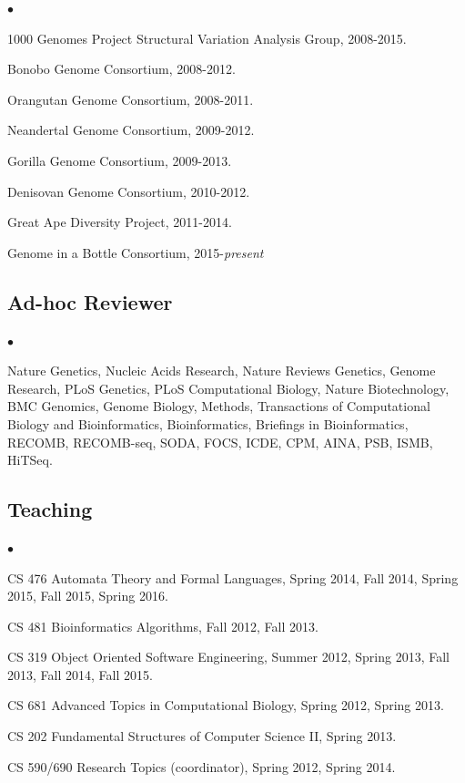 \documentclass[margin,line]{res}
\newenvironment{list2}{
  \begin{list}{$\bullet$}{%
      \setlength{\itemsep}{0in}
      \setlength{\parsep}{0in} \setlength{\parskip}{0in}
      \setlength{\topsep}{0in} \setlength{\partopsep}{0in} 
      \setlength{\leftmargin}{0.2in}}}{\end{list}}
\begin{document}
\begin{resume}
\begin{list2}
\item
  1000 Genomes Project Structural Variation Analysis Group, 2008-2015.
\item
  Bonobo Genome Consortium, 2008-2012.
\item
  Orangutan Genome Consortium, 2008-2011.
\item
  Neandertal Genome Consortium, 2009-2012.
\item
  Gorilla Genome Consortium, 2009-2013.
\item
  Denisovan Genome Consortium, 2010-2012.
\item
  Great Ape Diversity Project, 2011-2014.
\item
  Genome in a Bottle Consortium, 2015-{\it present}
\end{list2}


\vspace{-0.6cm}
\subsection{\small \sc Ad-hoc Reviewer}
\begin{list2}
\item
  Nature Genetics, Nucleic Acids Research, Nature Reviews Genetics, Genome Research, PLoS Genetics, PLoS Computational Biology, 
  Nature Biotechnology, BMC Genomics, Genome Biology, Methods, Transactions of Computational Biology and Bioinformatics,
  Bioinformatics, Briefings in Bioinformatics, RECOMB, RECOMB-seq, SODA, FOCS, ICDE, CPM, AINA, PSB, ISMB, HiTSeq.
\end{list2}


\vspace{-0.6cm}
\subsection{\small \sc Teaching}
\begin{list2}
  \item CS 476 Automata Theory and Formal Languages, Spring 2014, Fall 2014, Spring 2015, Fall 2015, Spring 2016.
  \item CS 481 Bioinformatics Algorithms, Fall 2012, Fall 2013.
  \item CS 319 Object Oriented Software Engineering, Summer 2012, Spring 2013, Fall 2013, Fall 2014, Fall 2015.
  \item CS 681 Advanced Topics in Computational Biology, Spring 2012, Spring 2013.
  \item CS 202 Fundamental Structures of Computer Science II, Spring 2013.
  \item CS 590/690 Research Topics (coordinator), Spring 2012, Spring 2014.
\end{list2}





\end{resume}
\end{document}
